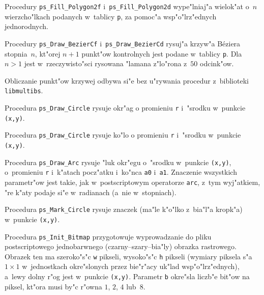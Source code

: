 \vspace{\bigskipamount}
Procedury \texttt{ps\_Fill\_Polygon2f} i~\texttt{ps\_Fill\_Polygon2d}
wype"lniaj"a wielok"at o~$n$ wierzcho"lkach podanych w~tablicy \texttt{p},
za pomoc"a wsp"o"lrz"ednych jednorodnych.

\vspace{\bigskipamount}
Procedury \texttt{ps\_Draw\_BezierCf} i~\texttt{ps\_Draw\_BezierCd}
rysuj"a krzyw"a B\'{e}ziera stopnia~$n$,
kt"orej $n+1$ punkt"ow kontrolnych jest podane w~tablicy \texttt{p}. Dla
$n>1$ jest w~rzeczywisto"sci rysowana "lamana z"lo"rona z~$50$ odcink"ow.

Obliczanie punkt"ow krzywej odbywa si"e bez u"rywania procedur z~biblioteki
\texttt{libmultibs}.

\vspace{\bigskipamount}
Procedura \texttt{ps\_Draw\_Circle} rysuje okr"ag o promieniu \texttt{r}
i~"srodku w~punkcie \texttt{(x,y)}.

\vspace{\bigskipamount}
Procedura \texttt{ps\_Draw\_Circle} rysuje ko"lo o promieniu \texttt{r}
i~"srodku w~punkcie \texttt{(x,y)}.

\vspace{\bigskipamount}
Procedura \texttt{ps\_Draw\_Arc} rysuje "luk okr"egu o~"srodku w~punkcie
\texttt{(x,y)}, o~promieniu \texttt{r} i~k"atach pocz"atku i~ko"nca
\texttt{a0} i~\texttt{a1}. Znaczenie wszystkich parametr"ow jest takie, jak
w~postscriptowym operatorze \texttt{arc}, z~tym wyj"atkiem, "re k"aty podaje
si"e w~radianach (a~nie w~stopniach).

\vspace{\bigskipamount}
Procedura \texttt{ps\_Mark\_Circle} rysuje znaczek (ma"le k"o"lko z~bia"l"a
kropk"a) w~punkcie \texttt{(x,y)}.

\vspace{\bigskipamount}
Procedura \texttt{ps\_Init\_Bitmap} przygotowuje wyprowadzanie do pliku
postscriptowego jednobarwnego (czarny--szary--bia"ly) obrazka rastrowego.
Obrazek ten ma szeroko"s"c \texttt{w}
pikseli, wysoko"s"c \texttt{h} pikseli (wymiary piksela s"a $1\times 1$
w~jednostkach okre"slonych przez bie"r"acy uk"lad wsp"o"lrz"ednych),
a~lewy dolny r"og jest w~punkcie \texttt{(x,y)}. Parametr \texttt{b}
okre"sla liczb"e bit"ow na piksel, kt"ora musi by"c r"owna $1$, $2$, $4$
lub~$8$.

